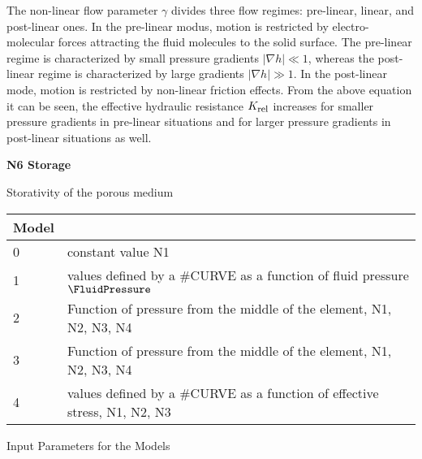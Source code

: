 The non-linear flow parameter $\gamma$ divides three flow regimes:
pre-linear, linear, and post-linear ones. In the pre-linear modus,
motion is restricted by electro-molecular forces attracting the
fluid molecules to the solid surface. The pre-linear regime is
characterized by small pressure gradients $|\nabla h|\ll 1$,
whereas the post-linear regime is characterized by large gradients
$|\nabla h|\gg 1$. In the post-linear mode, motion is restricted
by non-linear friction effects. From the above equation it can be
seen, the effective hydraulic resistance $K_{\mbox{\footnotesize
rel}}$ increases for smaller pressure gradients in pre-linear
situations and for larger pressure gradients in post-linear
situations as well.

\vspace{5mm}

\textbf{N6  Storage}

\vspace{0.5cm}

 Storativity of the porous medium

\vspace{0.5cm}

\begin{tabular}{l|l}
%
Model & \\
\hline
%
0 & constant value N1 \\
1 & values defined by a \#CURVE as a function of fluid pressure $\FluidPressure$\\
2 & Function of pressure from the middle of the element, N1, N2, N3, N4\\
3 & Function of pressure from the middle of the element, N1, N2, N3, N4\\
4 & values defined by a \#CURVE as a function of effective stress, N1, N2, N3 \\

\end{tabular}

\vspace{0.5cm}

Input Parameters for the Models

